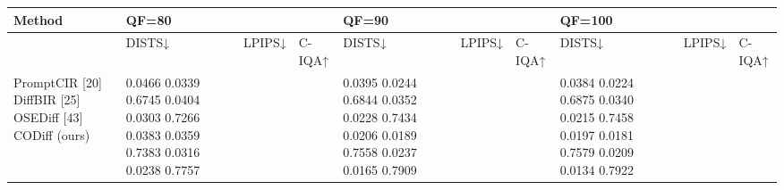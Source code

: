 \begin{tabular}{llllllllll}
\toprule
Method & QF=80 &  &  & QF=90 &  &  & QF=100 &  &  \\
\midrule
 & DISTS↓ & LPIPS↓ & C-IQA↑ & DISTS↓ & LPIPS↓ & C-IQA↑ & DISTS↓ & LPIPS↓ & C-IQA↑ \\
PromptCIR [20] DiffBIR [25] OSEDiff [43] CODiff (ours) & 0.0466 0.0339 0.6745 0.0404 0.0303 0.7266 0.0383 0.0359 0.7383 0.0316 0.0238 0.7757 &  &  & 0.0395 0.0244 0.6844 0.0352 0.0228 0.7434 0.0206 0.0189 0.7558 0.0237 0.0165 0.7909 &  &  & 0.0384 0.0224 0.6875 0.0340 0.0215 0.7458 0.0197 0.0181 0.7579 0.0209 0.0134 0.7922 &  &  \\
\bottomrule
\end{tabular}
